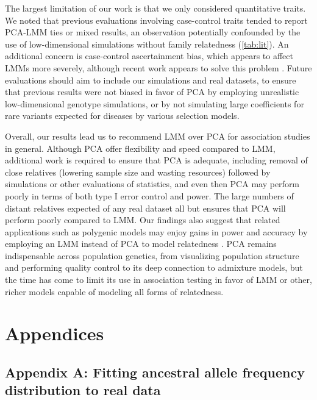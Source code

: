 \documentclass[11pt]{article}
\begin{document}
\begin{linenumbers}
The largest limitation of our work is that we only considered quantitative traits.
We noted that previous evaluations involving case-control traits tended to report PCA-LMM ties or mixed results, an observation potentially confounded by the use of low-dimensional simulations without family relatedness (\cref{tab:lit}).
An additional concern is case-control ascertainment bias, which appears to affect LMMs more severely, although recent work appears to solve this problem \citep{yang_advantages_2014, zhou_efficiently_2018}.
Future evaluations should aim to include our simulations and real datasets, to ensure that previous results were not biased in favor of PCA by employing unrealistic low-dimensional genotype simulations, or by not simulating large coefficients for rare variants expected for diseases by various selection models.

Overall, our results lead us to recommend LMM over PCA for association studies in general.
Although PCA offer flexibility and speed compared to LMM, additional work is required to ensure that PCA is adequate, including removal of close relatives (lowering sample size and wasting resources) followed by simulations or other evaluations of statistics, and even then PCA may perform poorly in terms of both type I error control and power.
The large numbers of distant relatives expected of any real dataset all but ensures that PCA will perform poorly compared to LMM.
Our findings also suggest that related applications such as polygenic models may enjoy gains in power and accuracy by employing an LMM instead of PCA to model relatedness \citep{rakitsch_lasso_2013,qian_fast_2020}.
PCA remains indispensable across population genetics, from visualizing population structure and performing quality control to its deep connection to admixture models, but the time has come to limit its use in association testing in favor of LMM or other, richer models capable of modeling all forms of relatedness.


\section{Appendices}

\subsection{Appendix A: Fitting ancestral allele frequency distribution to real data}


\end{linenumbers}
\end{document}
